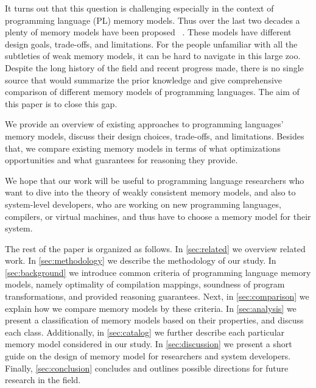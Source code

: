 It turns out that this question is challenging
especially in the context of programming language (PL) memory models.
Thus over the last two decades a plenty of memory models have been proposed~%
\cite{Manson-al:POPL05, Marino-al:PLDI10, Demange-al:POPL13, 
Batty-al:POPL11, Lahav-al:PLDI17, Dolan-al:PLDI18, Alglave-al:ASPLOS18, Watt-al:PLDI2020, 
Crary-Sullivan:POPL15, Zhang-Feng:FCS16, Jeffrey-Riely:LICS16, PichonPharabod-Sewell:POPL16, 
Kang-al:POPL17, Chakraborty-Vafeiadis:POPL19, Paviotti-al:ESOP20}. 
These models have different design goals, trade-offs, and limitations.
For the people unfamiliar with all the subtleties 
of weak memory models, it can be hard to navigate in this large zoo.
Despite the long history of the field and recent progress made, 
there is no single source that would summarize the prior knowledge
and give comprehensive comparison of different memory models
of programming languages. The aim of this paper is to close this gap.

We provide an overview of existing approaches to 
programming languages' memory models,
discuss their design choices, trade-offs, and limitations.
Besides that, we compare existing memory models 
in terms of what optimizations opportunities 
and what guarantees for reasoning they provide.

We hope that our work will be useful to programming language researchers 
who want to dive into the theory of weakly consistent memory models,
and also to system-level developers, 
who are working on new programming languages, compilers, or virtual machines, 
and thus have to choose a memory model for their system.

The rest of the paper is organized as follows.
In \cref{sec:related} we overview related work. 
In \cref{sec:methodology} we describe the methodology 
of our study. In \cref{sec:background} we 
introduce common criteria of programming language memory models,
namely optimality of compilation mappings, 
soundness of program transformations, 
and provided reasoning guarantees.
Next, in \cref{sec:comparison} we explain 
how we compare memory models by these criteria.
In \cref{sec:analysis} we present a classification
of memory models based on their properties, 
and discuss each class. 
Additionally, in \cref{sec:catalog} we further describe 
each particular memory model considered in our study.
In \cref{sec:discussion} we present a short guide 
on the design of memory model for researchers and system developers.
Finally, \cref{sec:conclusion} concludes 
and outlines possible directions for future research in the field. 
